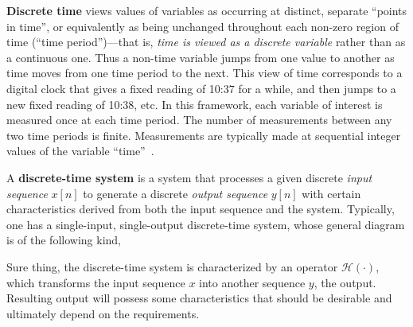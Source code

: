 \documentclass[\documentfontsize, twocolumn]{\classname}
\begin{document}
\textbf{Discrete time} views values of variables as occurring at distinct, separate ``points in time'', or equivalently as being unchanged throughout each non-zero region of time (``time pe\-ri\-od'')---that is, \emph{time is viewed as a discrete variable} rather than as a continuous one. Thus a non-time variable jumps from one value to another as time moves from one time period to the next. This view of time corresponds to a digital clock that gives a fixed reading of 10:37 for a while, and then jumps to a new fixed reading of 10:38, etc. In this framework, each variable of interest is measured once at each time period. The number of measurements between any two time periods is finite. Measurements are typically made at sequential integer values of the variable ``time''~\cite{bib:discreteTimeSystems}.

A \textbf{discrete-time system} is a system that processes a given discrete \emph{input sequence} $x[n]$ to generate a discrete \emph{output sequence} $y[n]$ with certain characteristics derived from both the input sequence and the system. Typically, one has a single-input, single-output discrete-time system, whose general diagram is of the following kind,
\begin{center}
\end{center}
Sure thing, the discrete-time system is characterized by an operator $\mathcal H(\cdot)$, which transforms the input sequence $x$ into another sequence $y$, the output. Resulting output will possess some characteristics that should be desirable and ultimately depend on the requirements.
\end{document}
